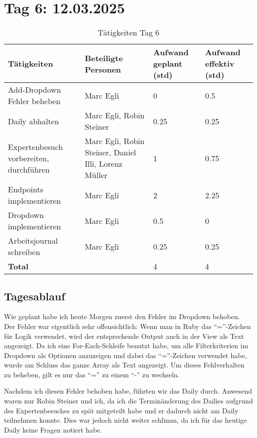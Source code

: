 \section{Tag 6: 12.03.2025}
\begin{table}[H]
    \begin{tabular}{|L{0.4\textwidth}|C{60pt}|C{60pt}|C{60pt}|}
        \hline
        \color{white}Tätigkeiten & \color{white}Beteiligte \color{white}Personen & \color{white}Aufwand geplant (std) & \color{white}Aufwand effektiv (std) \\
        \hline
        Add-Dropdown Fehler beheben & Marc Egli & 0 & 0.5 \\
        \hline
        Daily abhalten & Marc Egli, Robin Steiner & 0.25 & 0.25 \\
        \hline
        Expertenbesuch vorbereiten, durchführen & Marc Egli, Robin Steiner, Daniel Illi, Lorenz Müller & 1 & 0.75 \\
        \hline
        Endpoints implementieren & Marc Egli & 2 & 2.25 \\
        \hline
        Dropdown implementieren & Marc Egli & 0.5 & 0 \\
        \hline
        Arbeitsjournal schreiben & Marc Egli & 0.25 & 0.25 \\
        \textbf{Total} &  & 4 & 4 \\
        \hline
    \end{tabular}
    \caption{Tätigkeiten Tag 6}
\end{table}

\subsection*{Tagesablauf}
Wie geplant habe ich heute Morgen zuerst den Fehler im Dropdown behoben. Der Fehler war eigentlich sehr offensichtlich: Wenn man in Ruby das ``=''-Zeichen 
für Logik verwendet, wird der entsprechende Output auch in der View als Text angezeigt. Da ich eine For-Each-Schleife benutzt habe, um alle Filterkriterien im Dropdown
als Optionen anzuzeigen und dabei das ``=''-Zeichen verwendet habe, wurde am Schluss das ganze Array als Text angezeigt. Um dieses Fehlverhalten zu beheben, gilt es nur das ``='' zu einem 
``-'' zu wechseln. 

Nachdem ich diesen Fehler behoben habe, führten wir das Daily durch. Anwesend waren nur Robin Steiner und ich, da ich die Terminänderung des Dailies aufgrund des Expertenbesuches zu spät
mitgeteilt habe und er dadurch nicht am Daily teilnehmen konnte. Dies war jedoch nicht weiter schlimm, da ich für das heutige Daily keine Fragen notiert habe.

